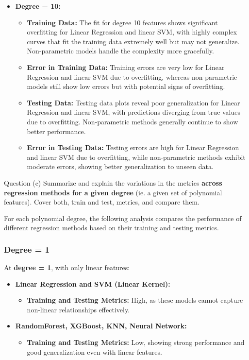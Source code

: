 \begin{itemize}
    \item \textbf{Degree = 10:}
    \begin{itemize}
        \item \textbf{Training Data:} The fit for degree 10 features shows significant overfitting for Linear Regression and linear SVM, with highly complex curves that fit the training data extremely well but may not generalize. Non-parametric models handle the complexity more gracefully.
        \item \textbf{Error in Training Data:} Training errors are very low for Linear Regression and linear SVM due to overfitting, whereas non-parametric models still show low errors but with potential signs of overfitting.
        \item \textbf{Testing Data:} Testing data plots reveal poor generalization for Linear Regression and linear SVM, with predictions diverging from true values due to overfitting. Non-parametric methods generally continue to show better performance.
        \item \textbf{Error in Testing Data:} Testing errors are high for Linear Regression and linear SVM due to overfitting, while non-parametric methods exhibit moderate errors, showing better generalization to unseen data.
    \end{itemize}
\end{itemize}

\begin{customboxnew}[label={box:Q3c}]{Question (c)}
	Summarize and explain the variations in the metrics \textbf{across regression methods for a given degree} (ie. a given set of polynomial features). Cover both, train and test, metrics, and compare them.
\end{customboxnew}

For each polynomial degree, the following analysis compares the performance of different regression methods based on their training and testing metrics.

\subsubsection*{Degree = 1}

At \textbf{degree = 1}, with only linear features:

\begin{itemize}
    \item \textbf{Linear Regression and SVM (Linear Kernel):} 
    \begin{itemize}
        \item \textbf{Training and Testing Metrics:} High, as these models cannot capture non-linear relationships effectively.
    \end{itemize}
    
    \item \textbf{RandomForest, XGBoost, KNN, Neural Network:}
    \begin{itemize}
        \item \textbf{Training and Testing Metrics:} Low, showing strong performance and good generalization even with linear features.
    \end{itemize}
\end{itemize}

